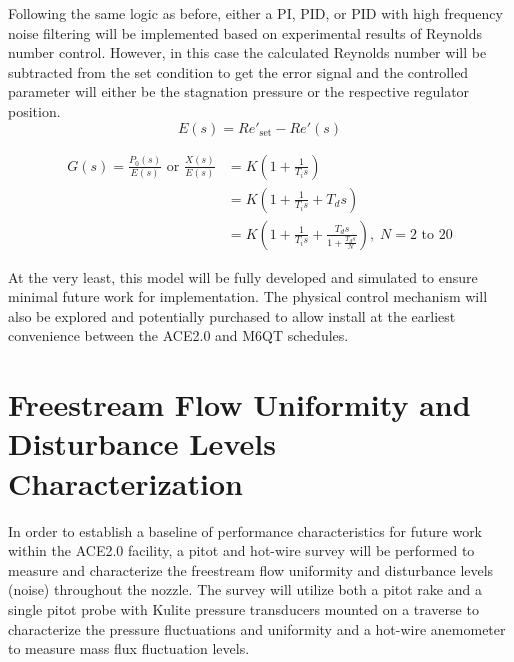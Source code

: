 Following the same logic as before, either a PI, PID, or PID with high frequency noise filtering will be implemented based on experimental results of Reynolds number control. However, in this case the calculated Reynolds number will be subtracted from the set condition to get the error signal and the controlled parameter will either be the stagnation pressure or the respective regulator position.
\begin{equation}
    E(s) = Re'_{\mathrm{set}} - Re'(s)
\end{equation}

\vspace{-1.5cm}
\begin{subequations}
    \begin{align}
        G(s) = \frac{P_0(s)}{E(s)} \textrm{ or } \frac{X(s)}{E(s)} &= K \left(1 + \frac{1}{T_i s}\right) \label{eq:Re-PI}\\
                                 &= K \left(1 + \frac{1}{T_i s} + T_d s\right) \label{eq:Re-PID}\\
                                 &= K \left(1 + \frac{1}{T_i s} + \frac{T_d s}{1+\frac{T_d s}{N}}\right), \; N=2\textrm{ to }20 \label{eq:Re-PID-filter}
    \end{align}
\end{subequations}

At the very least, this model will be fully developed and simulated to ensure minimal future work for implementation. The physical control mechanism will also be explored and potentially purchased to allow install at the earliest convenience between the ACE2.0 and M6QT schedules.

\section{Freestream Flow Uniformity and Disturbance Levels Characterization}

In order to establish a baseline of performance characteristics for future work within the ACE2.0 facility, a pitot and hot-wire survey will be performed to measure and characterize the freestream flow uniformity and disturbance levels (noise) throughout the nozzle. The survey will utilize both a pitot rake and a single pitot probe with Kulite pressure transducers mounted on a traverse to characterize the pressure fluctuations and uniformity and a hot-wire anemometer to measure mass flux fluctuation levels.

